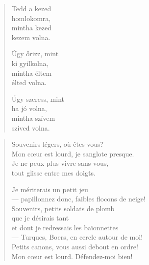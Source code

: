 \documentclass[11pt]{extbook}
\newcommand*{\centeredornament}{\centerline{\pgfornament[width=6cm]{88}}}
\begin{document}
\newpage

\vspace*{-15mm}
\centeredornament



\begin{verse}
  Tedd a kezed \\
  homlokomra, \\
  mintha kezed \\
  kezem volna.

  Úgy őrizz, mint \\
  ki gyilkolna, \\
  mintha éltem \\
  élted volna.

  Úgy szeress, mint \\
  ha jó volna, \\
  mintha szívem \\
  szíved volna.
\end{verse}

\newpage


\vspace*{-15mm}
\centeredornament




\begin{verse}
  Souvenirs légers, où êtes-vous? \\
  Mon cœur est lourd, je sanglote presque. \\
  Je ne peux plus vivre sans vous, \\
  tout glisse entre mes doigts.

  Je mériterais un petit jeu \\
  --- papillonnez donc, faibles flocons de neige! \\
  Souvenirs, petits soldats de plomb \\
  que je désirais tant \\
  et dont je redressais les baïonnettes \\
  --- Turques, Boers, en cercle autour de moi! \\
  Petits canons, vous aussi debout en ordre! \\
  Mon cœur est lourd. Défendez-moi bien!
\end{verse}
\end{document}
